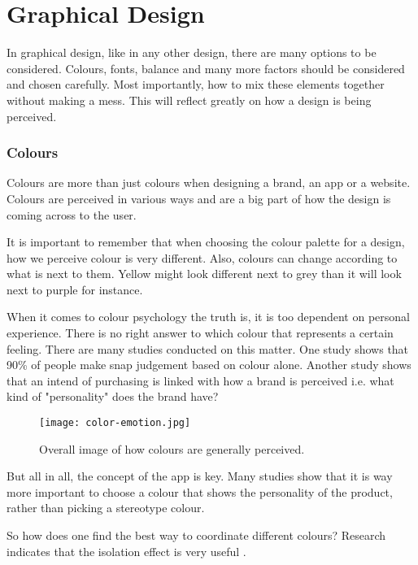\section{Graphical Design}\label{GraphicalDesign}
In graphical design, like in any other design, there are many options to be considered. Colours, fonts, balance and many more factors should be considered and chosen carefully. Most importantly, how to mix these elements together without making a mess. 
This will reflect greatly on how a design is being perceived. \cite{ColorMeaning}

\subsubsection{Colours}\label{Colours}

Colours are more than just colours when designing a brand, an app or a website. Colours are perceived in various ways and are a big part of how the design is coming across to the user. \cite{ColorMeaning}

It is important to remember that when choosing the colour palette for a design, how we perceive colour is very different. Also, colours can change according to what is next to them. Yellow might look different next to grey than it will look next to purple for instance. \cite{ColorMeaning}

When it comes to colour psychology the truth is, it is too dependent on personal experience. There is no right answer to which colour that represents a certain feeling. \cite{ColorMeaning}
There are many studies conducted on this matter. 
One study shows that 90\% of people make snap judgement based on colour alone. \cite{ColorMeaning} Another study shows that an intend of purchasing is linked with how a brand is perceived i.e. what kind of "personality" does the brand have?\cite{ColorMeaning}

\begin{figure}[H]
\centering
\texttt{[image: color-emotion.jpg]}
\caption{Overall image of how colours are generally perceived.} \cite{ColorMeaning}
\end{figure}

But all in all, the concept of the app is key. Many studies show that it is way more important to choose a colour that shows the personality of the product, rather than picking a stereotype colour. \cite{ColorMeaning}

So how does one find the best way to coordinate different colours? Research indicates that the isolation effect is very useful \cite{Normans}.

